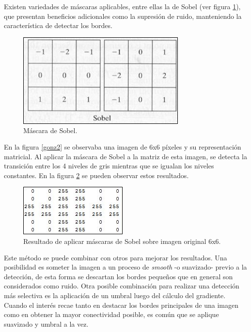 Existen variedades de máscaras aplicables, entre ellas la de Sobel (ver figura \ref{gonz5}), que presentan beneficios adicionales como la supresión de ruido, manteniendo la característica de detectar los bordes.

\begin{figure}[H]
\begin{center}
\includegraphics[scale=0.6]{img/08_matriz_sobel.jpg}
\end{center}
\caption{Máscara de Sobel.}
\label{gonz5}
\end{figure}

En la figura \ref{gonz2} se observaba una imagen de 6x6 píxeles y su representación matricial. Al aplicar la máscara de Sobel a la matriz de esta imagen, se detecta la transición entre los 4 niveles de gris mientras que se igualan los niveles constantes. En la figura \ref{gonz6} se pueden observar estos resultados.

\begin{figure}[H]
\begin{center}
\includegraphics[scale=0.8]{img/09_escala_grises_deteccion_borde.jpg}
\end{center}
\caption{Resultado de aplicar máscaras de Sobel sobre imagen original 6x6.}
\label{gonz6}
\end{figure}

 Este método se puede combinar con otros para mejorar los resultados. Una posibilidad es someter la imagen a un proceso de \textit{smooth} \cite{smooth} -o suavizado- previo a la detección, de esta forma se descartan los bordes pequeños que en general son considerados como ruido. Otra posible combinación para realizar una detección más selectiva es la aplicación de un umbral luego del cálculo del gradiente. Cuando el interés recae tanto en destacar los bordes principales de una imagen como en obtener la mayor conectividad posible, es común que se aplique suavizado y umbral a la vez.

